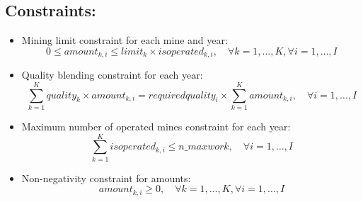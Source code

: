 \documentclass{article}
\begin{document}
\subsection*{Constraints:}

\begin{itemize}
    \item Mining limit constraint for each mine and year:
    \[
    0 \leq amount_{k, i} \leq limit_{k} \times isoperated_{k, i}, \quad \forall k = 1, \ldots, K, \forall i = 1, \ldots, I
    \]

    \item Quality blending constraint for each year:
    \[
    \sum_{k=1}^{K} quality_{k} \times amount_{k, i} = requiredquality_{i} \times \sum_{k=1}^{K} amount_{k, i}, \quad \forall i = 1, \ldots, I
    \]

    \item Maximum number of operated mines constraint for each year:
    \[
    \sum_{k=1}^{K} isoperated_{k, i} \leq n\_maxwork, \quad \forall i = 1, \ldots, I
    \]

    \item Non-negativity constraint for amounts:
    \[
    amount_{k, i} \geq 0, \quad \forall k = 1, \ldots, K, \forall i = 1, \ldots, I
    \]
\end{itemize}
\end{document}
